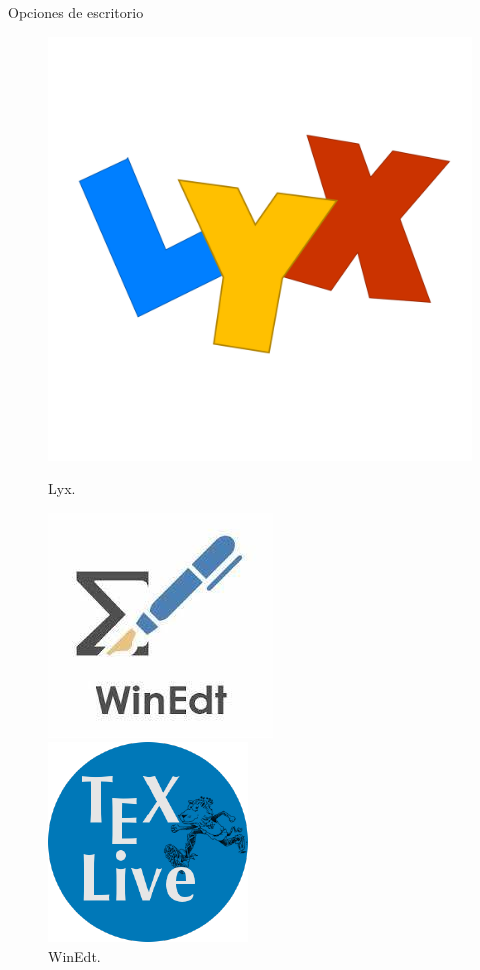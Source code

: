 \documentclass[aspectratio=169, 10pt]{beamer}
\begin{document}
\begin{frame}{Opciones de escritorio}
\begin{figure}
    \centering
    \begin{minipage}{0.10\textwidth}
        \includegraphics[scale=0.040]{lyx.png} 
        \caption*{Lyx.}
    \end{minipage}\hfill
    \begin{minipage}{0.10\textwidth}
        \includegraphics[scale=0.10]{WinEdt.jpg} 
        \caption*{WinEdt.}
    \end{minipage}\hfill
    \begin{minipage}{0.10\textwidth}
        \includegraphics[scale=0.10]{texlive1.png} 

\end{minipage}
\end{figure}
\end{frame}
\end{document}
